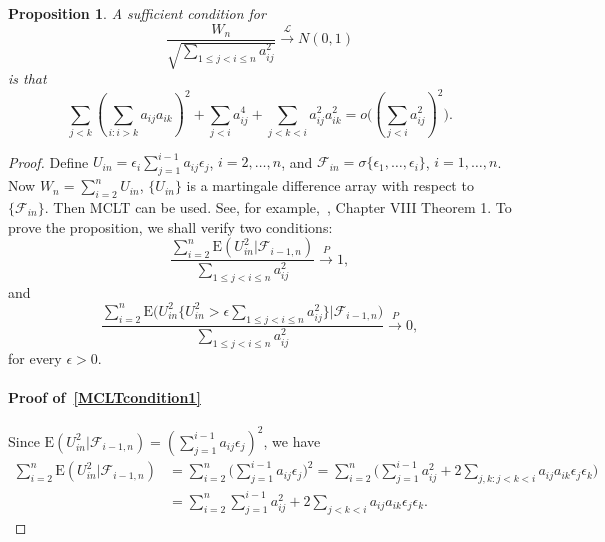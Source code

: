 \documentclass[review]{elsarticle}
\theoremstyle{plain}
\newtheorem{proposition}{\quad\quad Proposition}
\theoremstyle{definition}
\theoremstyle{remark}
\begin{document}
 \begin{proposition}\label{CLTprop}
     A sufficient condition for
     \begin{equation*}
         \frac{W_n}{\sqrt{\sum_{1\leq j<i\leq n} a_{ij}^2}}\xrightarrow{\mathcal{L}} N(0,1)
     \end{equation*}
     is that
     \begin{equation*}
         \sum_{j<k}{(\sum_{i:i>k}a_{ij}a_{ik})}^2+
         \sum_{j<i}a_{ij}^4+
         \sum_{j<k<i}a_{ij}^2 a_{ik}^2
         =o\big({(\sum_{j<i} a_{ij}^2)}^2\big).
     \end{equation*}
 \end{proposition}

 \begin{proof}
     Define $U_{in} =\epsilon_i \sum_{j=1}^{i-1} a_{ij}\epsilon_j$, $i=2,\ldots,n$, and $\mathcal{F}_{in}=\sigma\{\epsilon_1,\ldots,\epsilon_i\}$, $i=1,\ldots, n$.
     Now $W_n=\sum_{i=2}^n U_{in}$, $\{U_{in}\}$ is a martingale difference array with respect to $\{\mathcal{F}_{in}\}$. 
Then MCLT can be used. See, for example,~\cite{pollard1984convergence}, Chapter VIII Theorem 1.
     To prove the proposition, we shall verify two conditions:
     \begin{equation}\label{MCLTcondition1}
         \frac{\sum_{i=2}^n \mathrm{E}(U_{in}^2 |\mathcal{F}_{i-1,n})}{\sum_{1\leq j<i\leq n} a_{ij}^2}\xrightarrow{P} 1,
     \end{equation}
     and
     \begin{equation}\label{MCLTcondition2}
         \frac{\sum_{i=2}^n \mathrm{E}\big(U_{in}^2\big\{U_{in}^2>\epsilon \sum_{1\leq j<i\leq n} a_{ij}^2\big\}\big|\mathcal{F}_{i-1,n}\big)}{\sum_{1\leq j<i\leq n} a_{ij}^2}\xrightarrow{P} 0,
     \end{equation}
     for every $\epsilon>0$.

     \paragraph{Proof of~\eqref{MCLTcondition1}}
     Since $\mathrm{E}(U_{in}^2 |\mathcal{F}_{i-1,n})={(\sum_{j=1}^{i-1}a_{ij}\epsilon_j)}^2$, we have
     \begin{equation*}
         \begin{aligned}
\sum_{i=2}^n \mathrm{E}(U_{in}^2 |\mathcal{F}_{i-1,n})
             &=\sum_{i=2}^n \big(\sum_{j=1}^{i-1}a_{ij}\epsilon_j \big)^2
             =\sum_{i=2}^n \big( \sum_{j=1}^{i-1} a_{ij}^2 +2\sum_{j,k:j<k<i} a_{ij}a_{ik}\epsilon_j \epsilon_k \big)\\
             &=\sum_{i=2}^n  \sum_{j=1}^{i-1} a_{ij}^2 +2\sum_{j<k<i} a_{ij}a_{ik}\epsilon_j \epsilon_k.
         \end{aligned}
     \end{equation*}


\end{proof}
\end{document}
